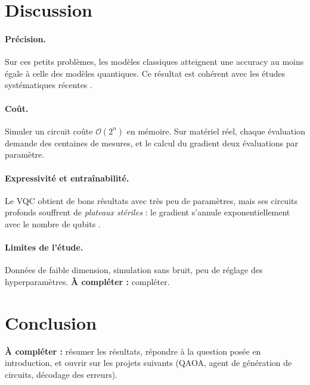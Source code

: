 \documentclass[11pt,a4paper]{article}
\newcommand{\afaire}[1]{\textcolor{orange!80!black}{\textbf{À compléter :} #1}}
\begin{document}
\section{Discussion}

\paragraph{Précision.} Sur ces petits problèmes, les modèles classiques atteignent une
accuracy au moins égale à celle des modèles quantiques. Ce résultat est cohérent avec les
études systématiques récentes \cite{bowles2024}.

\paragraph{Coût.} Simuler un circuit coûte $\mathcal{O}(2^n)$ en mémoire. Sur matériel réel,
chaque évaluation demande des centaines de mesures, et le calcul du gradient deux évaluations
par paramètre.

\paragraph{Expressivité et entraînabilité.} Le VQC obtient de bons résultats avec très peu
de paramètres, mais ses circuits profonds souffrent de \emph{plateaux stériles} : le gradient
s'annule exponentiellement avec le nombre de qubits \cite{mcclean2018}.

\paragraph{Limites de l'étude.} Données de faible dimension, simulation sans bruit, peu de
réglage des hyperparamètres. \afaire{compléter.}

\section{Conclusion}
\afaire{résumer les résultats, répondre à la question posée en introduction, et ouvrir sur
les projets suivants (QAOA, agent de génération de circuits, décodage des erreurs).}
\end{document}

